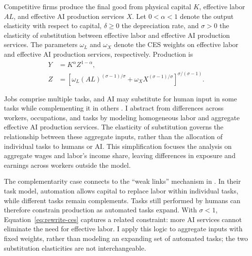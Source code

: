Competitive firms produce the final good from physical capital $K$, effective labor $AL$, and effective AI production services $X$. Let $0<\alpha<1$ denote the output elasticity with respect to capital, $\delta\geq0$ the depreciation rate, and $\sigma>0$ the elasticity of substitution between effective labor and effective AI production services. The parameters $\omega_L$ and $\omega_X$ denote the CES weights on effective labor and effective AI production services, respectively. Production is
\begin{align}
 Y&=K^\alpha Z^{1-\alpha},
 \label{eq:rewrite-output}\\
 Z&=\left[\omega_L(AL)^{(\sigma-1)/\sigma}
 +\omega_XX^{(\sigma-1)/\sigma}\right]^{
 \sigma/(\sigma-1)}.
 \label{eq:rewrite-ces}
\end{align}

Jobs comprise multiple tasks, and AI may substitute for human input in some
tasks while complementing it in others \citep{autor2013,acemoglurestrepo2019}.
I abstract from differences across workers, occupations, and tasks by modeling
homogeneous labor and aggregate effective AI production services. The elasticity of
substitution governs the relationship between these aggregate inputs, rather
than the allocation of individual tasks to humans or AI. This simplification
focuses the analysis on aggregate wages and labor's income share, leaving
differences in exposure and earnings across workers outside the model.

The complementarity case connects to the ``weak links'' mechanism in
\citet[Section~9.2.2]{aghionjonesjones2019}. In their task model,
automation allows capital to replace labor within individual tasks, while
different tasks remain complements. Tasks still performed by humans can
therefore constrain production as automated tasks expand. With $\sigma<1$,
Equation~\eqref{eq:rewrite-ces} captures a related constraint: more AI
services cannot eliminate the need for effective labor. I apply this logic
to aggregate inputs with fixed weights, rather than modeling an expanding
set of automated tasks; the two substitution elasticities are not interchangeable.

